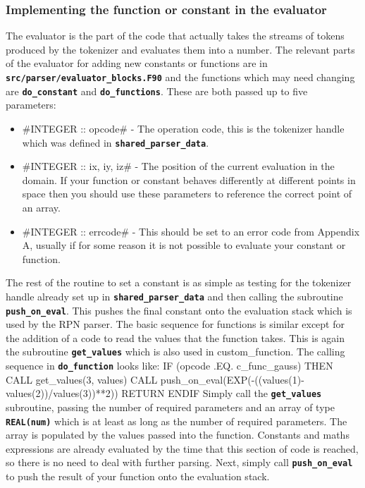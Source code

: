 \documentclass[12pt,a4paper]{article}
\newcommand{\inlinecode}[1]{{\color{warwickred} \bf\texttt{#1}}}
\newenvironment{boxverbatim}{\lboxverbatim{none}}{\endlboxverbatim}
\begin{document}
\subsubsection{Implementing the function or constant in the evaluator}
The evaluator is the part of the code that actually takes the streams of tokens
produced by the tokenizer and evaluates them into a number. The relevant parts
of the evaluator for adding new constants or functions are in
\inlinecode{src/parser/evaluator\_blocks.F90} and the functions which may need
changing are \inlinecode{do\_constant} and \inlinecode{do\_functions}. These are
both passed up to five parameters:
\begin{itemize}
\item #INTEGER :: opcode# - The operation code, this is the tokenizer handle
  which was defined in \inlinecode{shared\_parser\_data}.
\item #INTEGER :: ix, iy, iz# - The position of the current evaluation in the
  domain. If your function or constant behaves differently at different points
  in space then you should use these parameters to reference the correct point
  of an array.
\item #INTEGER :: errcode# - This should be set to an error code from
  Appendix A, usually\linebreak \inlinecode{c\_err\_bad\_value} if for some
  reason it is not possible to evaluate your constant or function.
\end{itemize}

The rest of the routine to set a constant is as simple as testing for the
tokenizer handle already set up in \inlinecode{shared\_parser\_data} and then
calling the subroutine \inlinecode{push\_on\_eval}. This pushes the final
constant onto the evaluation stack which is used by the RPN parser. The basic
sequence for functions is similar except for the addition of a code to read
the values that the function takes. This is again the subroutine
\inlinecode{get\_values} which is also used in custom\_function. The calling
sequence in \inlinecode{do\_function} looks like:
\begin{boxverbatim}
  IF (opcode .EQ. c_func_gauss) THEN
    CALL get_values(3, values)
    CALL push_on_eval(EXP(-((values(1)-values(2))/values(3))**2))
    RETURN
  ENDIF
\end{boxverbatim}
Simply call the \inlinecode{get\_values} subroutine, passing the number of
required parameters and an array of type \inlinecode{REAL(num)} which is at
least as long as the number of required parameters. The array is populated
by the values passed into the function. Constants and maths expressions are
already evaluated by the time that this section of code is reached, so there is
no need to deal with further parsing. Next, simply call
\inlinecode{push\_on\_eval} to push the result of your function onto the
evaluation stack.
\end{document}
